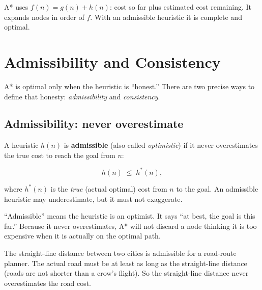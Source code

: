 \documentclass[a4paper,11pt]{article}
\newcommand{\vocab}[1]{\textbf{\color{navy}#1}}
\begin{document}
\begin{keytake}
A* uses $f(n) = g(n)+h(n)$: cost so far plus estimated cost remaining.
It expands nodes in order of $f$. With an admissible heuristic it is
complete and optimal.
\end{keytake}

\section{Admissibility and Consistency}

A* is optimal only when the heuristic is ``honest.'' There are two precise
ways to define that honesty: \emph{admissibility} and \emph{consistency}.

\subsection{Admissibility: never overestimate}

A heuristic $h(n)$ is \vocab{admissible} (also called \emph{optimistic}) if
it never overestimates the true cost to reach the goal from $n$:

\[
  h(n) \;\le\; h^*(n),
\]

where $h^*(n)$ is the \emph{true} (actual optimal) cost from $n$ to the goal.
An admissible heuristic may underestimate, but it must not exaggerate.

\begin{intuition}
``Admissible'' means the heuristic is an optimist. It says ``at best, the
goal is this far.'' Because it never overestimates, A* will not discard a
node thinking it is too expensive when it is actually on the optimal path.
\end{intuition}

\begin{everyday}
The straight-line distance between two cities is admissible for a
road-route planner. The actual road must be at least as long as the
straight-line distance (roads are not shorter than a crow's flight).
So the straight-line distance never overestimates the road cost.
\end{everyday}

\end{document}
